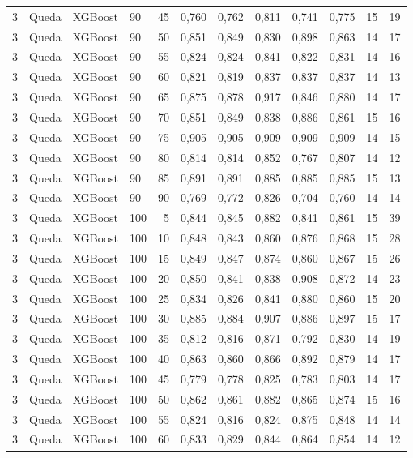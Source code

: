 \begin{longtable}{ccclrrrrrrrr}
3 & Queda & XGBoost & 90 & 45 & 0,760 & 0,762 & 0,811 & 0,741 & 0,775 & 15 & 19 \\
3 & Queda & XGBoost & 90 & 50 & 0,851 & 0,849 & 0,830 & 0,898 & 0,863 & 14 & 17 \\
3 & Queda & XGBoost & 90 & 55 & 0,824 & 0,824 & 0,841 & 0,822 & 0,831 & 14 & 16 \\
3 & Queda & XGBoost & 90 & 60 & 0,821 & 0,819 & 0,837 & 0,837 & 0,837 & 14 & 13 \\
3 & Queda & XGBoost & 90 & 65 & 0,875 & 0,878 & 0,917 & 0,846 & 0,880 & 14 & 17 \\
3 & Queda & XGBoost & 90 & 70 & 0,851 & 0,849 & 0,838 & 0,886 & 0,861 & 15 & 16 \\
3 & Queda & XGBoost & 90 & 75 & 0,905 & 0,905 & 0,909 & 0,909 & 0,909 & 14 & 15 \\
3 & Queda & XGBoost & 90 & 80 & 0,814 & 0,814 & 0,852 & 0,767 & 0,807 & 14 & 12 \\
3 & Queda & XGBoost & 90 & 85 & 0,891 & 0,891 & 0,885 & 0,885 & 0,885 & 15 & 13 \\
3 & Queda & XGBoost & 90 & 90 & 0,769 & 0,772 & 0,826 & 0,704 & 0,760 & 14 & 14 \\
3 & Queda & XGBoost & 100 & 5 & 0,844 & 0,845 & 0,882 & 0,841 & 0,861 & 15 & 39 \\
3 & Queda & XGBoost & 100 & 10 & 0,848 & 0,843 & 0,860 & 0,876 & 0,868 & 15 & 28 \\
3 & Queda & XGBoost & 100 & 15 & 0,849 & 0,847 & 0,874 & 0,860 & 0,867 & 15 & 26 \\
3 & Queda & XGBoost & 100 & 20 & 0,850 & 0,841 & 0,838 & 0,908 & 0,872 & 14 & 23 \\
3 & Queda & XGBoost & 100 & 25 & 0,834 & 0,826 & 0,841 & 0,880 & 0,860 & 15 & 20 \\
3 & Queda & XGBoost & 100 & 30 & 0,885 & 0,884 & 0,907 & 0,886 & 0,897 & 15 & 17 \\
3 & Queda & XGBoost & 100 & 35 & 0,812 & 0,816 & 0,871 & 0,792 & 0,830 & 14 & 19 \\
3 & Queda & XGBoost & 100 & 40 & 0,863 & 0,860 & 0,866 & 0,892 & 0,879 & 14 & 17 \\
3 & Queda & XGBoost & 100 & 45 & 0,779 & 0,778 & 0,825 & 0,783 & 0,803 & 14 & 17 \\
3 & Queda & XGBoost & 100 & 50 & 0,862 & 0,861 & 0,882 & 0,865 & 0,874 & 15 & 16 \\
3 & Queda & XGBoost & 100 & 55 & 0,824 & 0,816 & 0,824 & 0,875 & 0,848 & 14 & 14 \\
3 & Queda & XGBoost & 100 & 60 & 0,833 & 0,829 & 0,844 & 0,864 & 0,854 & 14 & 12 \\

\end{longtable}
